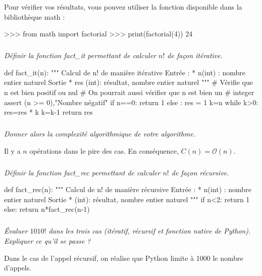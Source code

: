 \documentclass[10pt,fleqn]{article} %
\begin{document}
\begin{multicols}{2}
\begin{rem}
Pour vérifier vos résultats, vous pouvez utiliser la fonction disponible dans la bibliothèque \textsf{math} : 
\begin{python}
>>> from math import factorial
>>> print(factorial(4)) 
       24
\end{python}
\end{rem}
\subparagraph{}
\textit{Définir la fonction \textsl{fact\_it} permettant de calculer $n!$ de façon itérative.}
\ifprof
\begin{corrige}
\begin{python}
def fact_it(n):
    """
    Calcul de n! de manière itérative
    Entrée : 
     * n(int) : nombre entier naturel
    Sortie 
     * res (int): résultat, nombre entier naturel
    """
    # Vérifie que n est bien positif ou nul
    # On pourrait aussi vérifier que n est bien un 
    # integer
    assert (n >= 0),"Nombre négatif" 
    if n==0:
        return 1
    else :
        res = 1
        k=n
        while k>0:
            res=res * k
            k=k-1
        return res
\end{python}
\end{corrige}
\else
\fi


\subparagraph{}
\textit{Donner alors la complexité algorithmique de votre algorithme.}
\ifprof
\begin{corrige}
Il y a $n$ opérations dans le pire des cas. En conséquence, $C(n)=\mathcal{O}(n)$.
\end{corrige}
\else
\fi

\subparagraph{}
\textit{Définir la fonction \textsl{fact\_rec} permettant de calculer $n!$ de façon récursive.}
\ifprof
\begin{corrige}
\begin{python}
def fact_rec(n):
    """
    Calcul de n! de manière récursive
    Entrée : 
     * n(int) : nombre entier naturel
    Sortie 
     * (int): résultat, nombre entier naturel
    """
    if n<2:
        return 1
    else:
        return n*fact_rec(n-1)
\end{python}
\end{corrige}
\else
\fi


\subparagraph{}
\textit{Évaluer $1010!$ dans les trois cas (itératif, récursif et fonction native de Python). Expliquer ce qu'il se passe ?}
\ifprof
\begin{corrige}
Dans le cas de l'appel récursif, on réalise que Python limite à 1000 le nombre d'appels. 
\end{corrige}
\else
\fi


\end{multicols}
\end{document}
